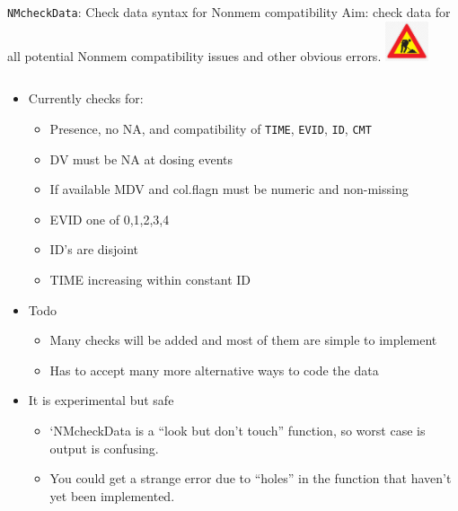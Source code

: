 \documentclass[
  8pt,
  ignorenonframetext,
  aspectratio=169]{beamer}
\providecommand{\tightlist}{%
  \setlength{\itemsep}{0pt}\setlength{\parskip}{0pt}}
\begin{document}
\begin{frame}[fragile]{\texttt{NMcheckData}: Check data syntax for
Nonmem compatibility}
\protect\hypertarget{nmcheckdata-check-data-syntax-for-nonmem-compatibility}{}
Aim: check data for all potential Nonmem compatibility issues and other
obvious errors. \includegraphics[width=0.5in]{figures/worksign.png}

\begin{columns}[T]
\begin{column}{0.48\textwidth}
\begin{itemize}
\tightlist
\item
  Currently checks for:

  \begin{itemize}
  \tightlist
  \item
    Presence, no NA, and compatibility of \texttt{TIME}, \texttt{EVID},
    \texttt{ID}, \texttt{CMT}
  \item
    DV must be NA at dosing events
  \item
    If available MDV and col.flagn must be numeric and non-missing
  \item
    EVID one of 0,1,2,3,4
  \item
    ID's are disjoint
  \item
    TIME increasing within constant ID
  \end{itemize}
\item
  Todo

  \begin{itemize}
  \tightlist
  \item
    Many checks will be added and most of them are simple to implement
  \item
    Has to accept many more alternative ways to code the data
  \end{itemize}
\item
  It is experimental but safe

  \begin{itemize}
  \tightlist
  \item
    `NMcheckData is a ``look but don't touch'' function, so worst case
    is output is confusing.
  \item
    You could get a strange error due to ``holes'' in the function that
    haven't yet been implemented.
  \end{itemize}
\end{itemize}
\end{column}


\end{columns}
\end{frame}
\end{document}
